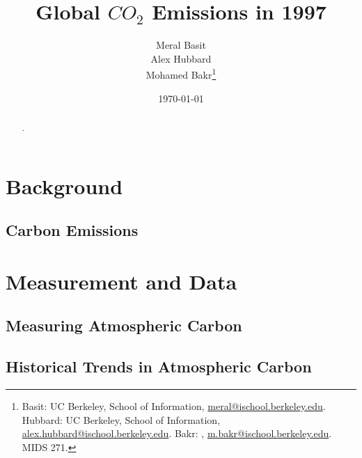 \documentclass[AER]{AEA}
\begin{document}
\title{Global \(CO_{2}\) Emissions in 1997}


\author{
  Meral Basit\\
  Alex Hubbard\\
  Mohamed Bakr\thanks{
  Basit: UC Berkeley, School of
Information, \href{mailto:meral@ischool.berkeley.edu}{meral@ischool.berkeley.edu}.
  Hubbard: UC Berkeley, School of
Information, \href{mailto:alex.hubbard@ischool.berkeley.edu}{alex.hubbard@ischool.berkeley.edu}.
  Bakr: , \href{mailto:m.bakr@ischool.berkeley.edu}{m.bakr@ischool.berkeley.edu}.
  MIDS 271.
}
}

\date{\today}
\JEL{}

\begin{abstract}
.
\end{abstract}


\maketitle

\section{Background}\label{background}

\subsection{Carbon Emissions}\label{carbon-emissions}

\section{Measurement and Data}\label{measurement-and-data}

\subsection{Measuring Atmospheric
Carbon}\label{measuring-atmospheric-carbon}

\subsection{Historical Trends in Atmospheric
Carbon}\label{historical-trends-in-atmospheric-carbon}
\end{document}
